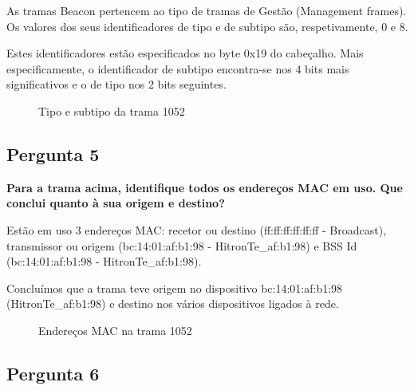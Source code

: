 \documentclass[11pt]{article}
\begin{document}
As tramas Beacon pertencem ao tipo de tramas de Gestão (Management frames). Os valores dos seus identificadores de tipo e de subtipo são, respetivamente, 0 e 8.

Estes identificadores estão especificados no byte 0x19 do cabeçalho. Mais especificamente, o identificador de subtipo encontra-se nos 4 bits mais significativos e o de tipo nos 2 bits seguintes.

\begin{figure}[hbt!]
    \centering
    \caption{Tipo e subtipo da trama 1052}
\end{figure}

\subsection{Pergunta 5}

\textbf{Para a trama acima, identifique todos os endereços MAC em uso. Que conclui quanto à sua origem e destino?}

Estão em uso 3 endereços MAC: recetor ou destino (ff:ff:ff:ff:ff:ff - Broadcast), transmissor ou origem (bc:14:01:af:b1:98 - HitronTe\_af:b1:98) e BSS Id (bc:14:01:af:b1:98 - HitronTe\_af:b1:98).

Concluímos que a trama teve origem no dispositivo bc:14:01:af:b1:98 (HitronTe\_af:b1:98) e destino nos vários dispositivos ligados à rede.

\begin{figure}[hbt!]
    \centering
    \caption{Endereços MAC na trama 1052}
\end{figure}

\subsection{Pergunta 6}
\end{document}
